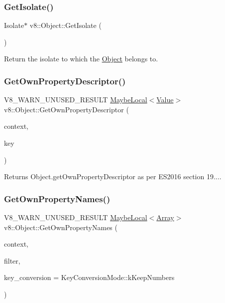\subsubsection{\texorpdfstring{Get\+Isolate()}{GetIsolate()}}
{\footnotesize\ttfamily Isolate$\ast$ v8\+::\+Object\+::\+Get\+Isolate (\begin{DoxyParamCaption}{ }\end{DoxyParamCaption})}

Return the isolate to which the \mbox{\hyperlink{classv8_1_1Object}{Object}} belongs to. \mbox{\label{classv8_1_1Object_a96c87fe175a5f66b156bb9fa472e480d}} 
\subsubsection{\texorpdfstring{Get\+Own\+Property\+Descriptor()}{GetOwnPropertyDescriptor()}}
{\footnotesize\ttfamily V8\+\_\+\+W\+A\+R\+N\+\_\+\+U\+N\+U\+S\+E\+D\+\_\+\+R\+E\+S\+U\+LT \mbox{\hyperlink{classv8_1_1MaybeLocal}{Maybe\+Local}}$<$\mbox{\hyperlink{classv8_1_1Value}{Value}}$>$ v8\+::\+Object\+::\+Get\+Own\+Property\+Descriptor (\begin{DoxyParamCaption}\item[{\mbox{\hyperlink{classv8_1_1Local}{Local}}$<$ Context $>$}]{context,  }\item[{\mbox{\hyperlink{classv8_1_1Local}{Local}}$<$ \mbox{\hyperlink{classv8_1_1Name}{Name}} $>$}]{key }\end{DoxyParamCaption})}

Returns Object.\+get\+Own\+Property\+Descriptor as per E\+S2016 section 19.... \mbox{\label{classv8_1_1Object_a345cc5b8e646c89bdf03b76f60544c91}} 
\subsubsection{\texorpdfstring{Get\+Own\+Property\+Names()}{GetOwnPropertyNames()}}
{\footnotesize\ttfamily V8\+\_\+\+W\+A\+R\+N\+\_\+\+U\+N\+U\+S\+E\+D\+\_\+\+R\+E\+S\+U\+LT \mbox{\hyperlink{classv8_1_1MaybeLocal}{Maybe\+Local}}$<$\mbox{\hyperlink{classv8_1_1Array}{Array}}$>$ v8\+::\+Object\+::\+Get\+Own\+Property\+Names (\begin{DoxyParamCaption}\item[{\mbox{\hyperlink{classv8_1_1Local}{Local}}$<$ Context $>$}]{context,  }\item[{\mbox{\hyperlink{namespacev8_afbf02b6b1152a3e25d7bde90798209ac}{Property\+Filter}}}]{filter,  }\item[{\mbox{\hyperlink{namespacev8_aa65aeff871614520d8033dead4b34e38}{Key\+Conversion\+Mode}}}]{key\+\_\+conversion = {\ttfamily KeyConversionMode\+:\+:kKeepNumbers} }\end{DoxyParamCaption})}


